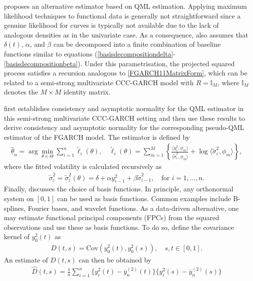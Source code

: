 \documentclass[12pt,a4paper]{article}
\theoremstyle{definition}
\begin{document}
\citet{Cerovecki2019} proposes an alternative estimator based on QML estimation. Applying maximum likelihood techniques to functional data is generally not straightforward since a genuine likelihood for curves is typically not available due to the lack of analogous densities as in the univariate case. As a consequence, \citet{Cerovecki2019} also assumes that $\delta(t)$, $\alpha$, and $\beta$ can be decomposed into a finite combination of baseline functions similar to equations (\ref{basisdecompositiondelta}-\ref{basisdecompositionbeta}). Under this parametrisation, the projected squared process satisfies a recursion analogous to \cref{FGARCH11MatrixForm}, which can be related to a semi-strong multivariate CCC-GARCH model with $R=\mathbb{I}_M$, where $\mathbb{I}_M$ denotes the $M\times M$ identity matrix.

\citet{Cerovecki2019} first establishes consistency and asymptotic normality for the QML estimator in this semi-strong multivariate CCC-GARCH setting and then use these results to derive consistency and asymptotic normality for the corresponding pseudo-QML estimator of the FGARCH model. The estimator is defined by
\begin{gather}
\label{QMLestimationequation}
    \underline{\hat{\theta}}_n= \arg \min_{\theta \in \Theta} \sum_{i=1}^n \tilde{\ell}_i(\theta), \quad \tilde{\ell}_i(\theta)=\sum_{m=1}^M\left\{\frac{\langle y_i^2,\phi_m\rangle}{\langle \tilde{\sigma}_i^2,\phi_m\rangle}+\log\langle \tilde{\sigma}_i^2,\phi_m\rangle \right\},
\end{gather}
where the fitted volatility is calculated recursively as
\begin{gather}
    \tilde{\sigma}_i^2=\tilde{\sigma}_i^2(\theta) = \delta+\alpha y_{i-1}^2+ \beta \tilde{\sigma}_{i-1}^2, \quad \text{for }i=1,...,n.
\end{gather}
Finally, \citet{Aue2017} discusses the choice of basis functions. In principle, any orthonormal system on $[0,1]$ can be used as basis functions. Common examples include B-splines, Fourier bases, and wavelet functions. As a data-driven alternative, one may estimate functional principal components (FPCs) from the squared observations and use these as basis functions. To do so, define the covariance kernel of $y_0^2(t)$ as
\begin{gather}
    D(t,s) = \text{Cov}(y_0^2(t),y_0^2(s)), \quad s,t\in[0,1].
\end{gather}
An estimate of $D(t,s)$ can then  be obtained by
\begin{gather}
    \hat{D}(t,s) = \frac{1}{n}\sum_{i=1}^n\{y_i^2(t)-\overline{y}_n^{(2)}(t)\}\{y_i^2(s)-\overline{y}_n^{(2)}(s)\}
\end{gather}
\end{document}
